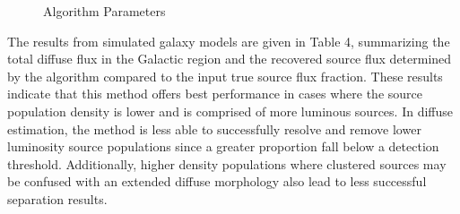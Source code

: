 \documentclass{PoS}
\begin{document}
\begin{figure}
\vspace{-10pt}
\centering
{}
\makeatletter
\def\@captype{table}
\makeatother
\caption{Algorithm Parameters}
\vspace{-10pt}
\end{figure}

The results from simulated galaxy models are given in Table 4, summarizing the total diffuse flux in the Galactic region and the recovered source flux determined by the algorithm compared to the input true source flux fraction. These results indicate that this method offers best performance in cases where the source population density is lower and is comprised of more luminous sources. In diffuse estimation, the method is less able to successfully resolve and remove lower luminosity source populations since a greater proportion fall below a detection threshold. Additionally, higher density populations where clustered sources may be confused with an extended diffuse morphology also lead to less successful separation results.

\begin{table}
\centering
{}
\makeatletter
\def\@captype{table}
\makeatother
\caption{Galactic Plane recovered diffuse fluxes}
\end{table}
\end{document}
